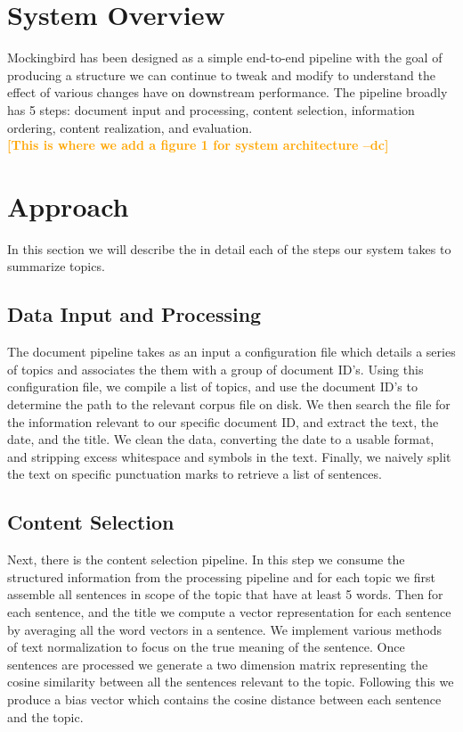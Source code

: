 \documentclass[11pt,a4paper]{article}
\newcommand{\spacemanidol}[1]{\textcolor{orange}{\bf \small [#1 --dc]}}
\begin{document}
\section{System Overview}
Mockingbird has been designed as a simple end-to-end pipeline with the goal of producing a structure we can continue to tweak and modify to understand the effect of various changes have on downstream performance. The pipeline broadly has 5 steps: document input and processing, content selection, information ordering, content realization, and evaluation.\\
\spacemanidol{This is where we add a figure 1 for system architecture}
\section{Approach}
In this section we will describe the in detail each of the steps our system takes to summarize topics.
\subsection{Data Input and Processing}
The document pipeline takes as an input a configuration file which details a series of topics and associates the them with a group of document ID's. Using this configuration file, we compile a list of topics, and use the document ID's to determine the path to the relevant corpus file on disk. We then search the file for the information relevant to our specific document ID, and extract the text, the date, and the title. We clean the data, converting the date to a usable format, and stripping excess whitespace and symbols in the text. Finally, we naively split the text on specific punctuation marks to retrieve a list of sentences. \\
\subsection{Content Selection}
Next, there is the content selection pipeline. In this step we consume the structured information from the processing pipeline and for each topic we first assemble all sentences in scope of the topic that have at least 5 words. Then for each sentence, and the title we compute a vector representation for each sentence by averaging all the word vectors in a sentence. We implement various methods of text normalization to focus on the true meaning of the sentence. Once sentences are processed we generate a two dimension matrix representing the cosine similarity between all the sentences relevant to the topic. Following this we produce a bias vector which contains the cosine distance between each sentence and the topic. 
\end{document}
